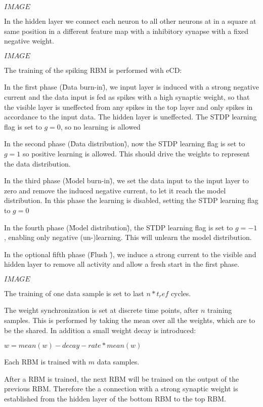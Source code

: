 $IMAGE$

In the hidden layer we connect each neuron to all other neurons at in a square at same position in a different feature map with a inhibitory synapse with a fixed negative weight.

$IMAGE$ 

The training of the spiking RBM is performed with eCD:

In the first phase (\"Data burn-in\"), we input layer is induced with a strong negative current and the data input is fed as spikes with a high synaptic weight, so that the visible layer is uneffected from any spikes in the top layer and only spikes in accordance to the input data.
The hidden layer is uneffected.
The STDP learning flag is set to $g=0$, so no learning is allowed

In the second phase (\"Data distribution\"), now the STDP learning flag is set to $g=1$ so positive learning is allowed.
This should drive the weights to represent the data distribution.

In the third phase (\"Model burn-in\"), we set the data input to the input layer to zero and remove the induced negative current, to let it reach the model distribution.
In this phase the learning is disabled, setting the STDP learning flag to $g=0$

In the fourth phase (\"Model distribution\"), the STDP learning flag is set to $g=-1$, enabling only negative (un-)learning.
This will unlearn the model distribution.

In the optional fifth phase (\"Flush \"), we induce a strong current to the visible and hidden layer to remove all activity and allow a fresh start in the first phase.

$IMAGE$

The training of one data sample is set to last $n * t_ref$ cycles.

The weight synchronization is set at discrete time points, after $n$ training samples.
This is performed by taking the mean over all the weights, which are to be the shared.
In addition a small weight decay is introduced:

$w = mean(w) - decay-rate * mean(w)$

Each RBM is trained with $m$ data samples.

After a RBM is trained, the next RBM will be trained on the output of the previous RBM.
Therefore the a connection with a strong synaptic weight is established from the hidden layer of the bottom RBM to the top RBM.

